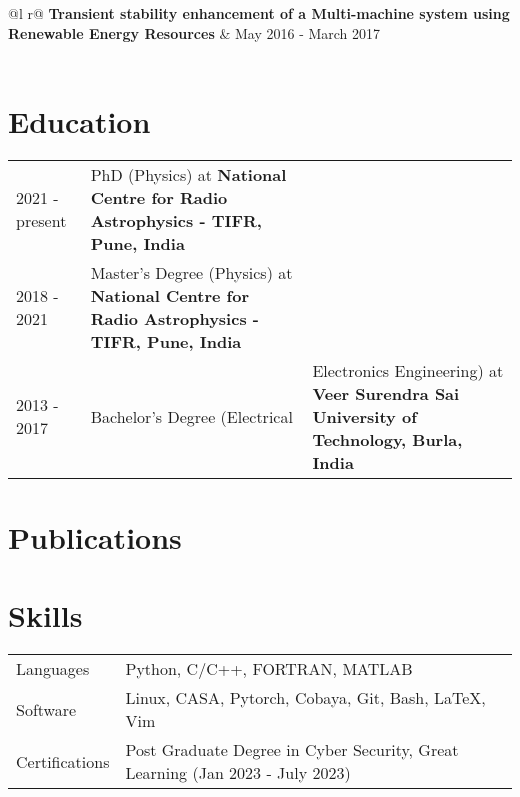 \documentclass[a4paper,12pt]{article}
\begin{document}
\begin{tabularx}{\linewidth}{ @{}l r@{} }
\textbf{Transient stability enhancement of a Multi-machine system using Renewable Energy Resources} & \hfill May 2016 - March 2017  \\[3.75pt]
  \\
\end{tabularx}


\section{Education}
\begin{tabularx}{\linewidth}{@{}l X@{}}	
2021 - present & PhD (Physics) at \textbf{National Centre for Radio Astrophysics - TIFR, Pune, India} \\

2018 - 2021 & Master's Degree (Physics) at \textbf{National Centre for Radio Astrophysics - TIFR, Pune, India}  \\ 

2013 - 2017 & Bachelor's Degree (Electrical & Electronics Engineering) at \textbf{Veer Surendra Sai University of Technology, Burla, India} \\ 
\end{tabularx}

\section{Publications}
\printbibliography[heading=none]

\section{Skills}
\begin{tabularx}{\linewidth}{@{}l X@{}}
Languages &  \normalsize{Python, C/C++, FORTRAN, MATLAB}\\
Software  &  \normalsize{Linux, CASA, Pytorch, Cobaya, Git, Bash, LaTeX, Vim}\\  
Certifications & \normalsize{Post Graduate Degree in Cyber Security, Great Learning (Jan 2023 - July 2023)} \\
\end{tabularx}

\vfill
{}
\end{document}
